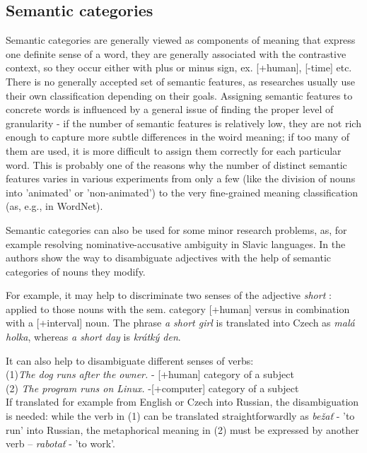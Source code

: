 \documentclass[letterpaper]{article}
\newcommand{\todofn}[1] {
 \footnote{\textbf{TODO : #1}}}
\begin{document}
\subsection{Semantic categories}
Semantic categories are generally viewed as components of meaning
that express one definite sense of a word, they are generally associated
with the contrastive context, so they occur either with plus or minus
sign, ex. [+human], [-time] etc. 
There is no generally accepted set of semantic features, as researches
usually use their own classification depending on their goals. Assigning 
semantic features to concrete words is influenced by a general issue 
of finding the proper level of granularity - if the number of semantic features is relatively 
low, they are not rich enough to capture more subtle differences in the woird meaning;
if too many of them are used, it is more difficult to assign them correctly
for each particular word. This is probably one of the reasons why the 
number of distinct semantic features varies in various experiments 
from only a few (like
the division of nouns into 'animated' or 'non-animated') to the very
fine-grained meaning classification (as, e.g., in WordNet).

Semantic categories can also be used for some minor research problems, as, for example
resolving nominative-accusative ambiguity in Slavic languages.
In \cite{principled_disam} the authors show the way to disambiguate adjectives
with the help of semantic categories of nouns they modify. 

For example, it may help 
to discriminate two senses of the adjective \textit{short}
: applied to those nouns with the sem. category [+human] versus in combination
with a [+interval] noun. The phrase \textit{a short girl} is translated
into Czech as \textit{mal\'{a} holka}, whereas \textit{a short day} is \textit{kr\'{a}tk\'{y} den}.

It can also help to disambiguate different senses of verbs:\\ 
(1)\textit{The dog runs after the owner.} - [+human] category of a subject\\
(2) \textit{The program runs on Linux.} -[+computer] category of a subject \\
If translated for example from English or Czech into Russian, the disambiguation is needed:
while the verb in (1) can be translated straightforwardly as \textit{be\v{z}a\v{t}} - 'to run' into Russian,
the metaphorical meaning in (2) must be expressed by another verb -- \textit{rabota\v{t}} - 'to work'.
\end{document}
